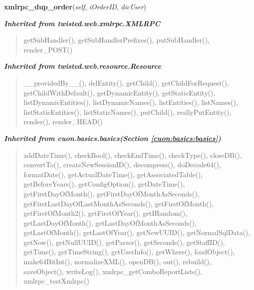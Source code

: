     \vspace{0.5ex}

\hspace{.8\funcindent}\begin{boxedminipage}{\funcwidth}

    \raggedright \textbf{xmlrpc\_dup\_order}(\textit{self}, \textit{iOrderID}, \textit{dicUser})

\setlength{\parskip}{2ex}
\setlength{\parskip}{1ex}
    \end{boxedminipage}


\large{\textbf{\textit{Inherited from twisted.web.xmlrpc.XMLRPC}}}

\begin{quote}
getSubHandler(), getSubHandlerPrefixes(), putSubHandler(), render\_POST()
\end{quote}

\large{\textbf{\textit{Inherited from twisted.web.resource.Resource}}}

\begin{quote}
\_\_providedBy\_\_(), delEntity(), getChild(), getChildForRequest(), getChildWithDefault(), getDynamicEntity(), getStaticEntity(), listDynamicEntities(), listDynamicNames(), listEntities(), listNames(), listStaticEntities(), listStaticNames(), putChild(), reallyPutEntity(), render(), render\_HEAD()
\end{quote}

\large{\textbf{\textit{Inherited from cuon.basics.basics\textit{(Section \ref{cuon:basics:basics})}}}}

\begin{quote}
addDateTime(), checkBool(), checkEndTime(), checkType(), closeDB(), convertTo(), createNewSessionID(), decompress(), doDecode64(), formatDate(), getActualDateTime(), getAssociatedTable(), getBeforeYears(), getConfigOption(), getDateTime(), getFirstDayOfMonth(), getFirstDayOfMonthAsSeconds(), getFirstLastDayOfLastMonthAsSeconds(), getFirstOfMonth(), getFirstOfMonth2(), getFirstOfYear(), getIRandom(), getLastDayOfMonth(), getLastDayOfMonthAsSeconds(), getLastOfMonth(), getLastOfYear(), getNewUUID(), getNormalSqlData(), getNow(), getNullUUID(), getParser(), getSeconds(), getStaffID(), getTime(), getTimeString(), getUserInfo(), getWhere(), loadObject(), make64BitInt(), normalizeXML(), openDB(), out(), rebuild(), saveObject(), writeLog(), xmlrpc\_getComboReportLists(), xmlrpc\_testXmlrpc()
\end{quote}


